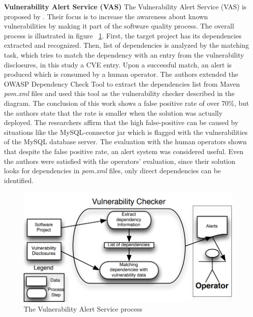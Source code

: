 \documentclass[pdf,bookmarks,colorlinks=true]{IEEEtran}
\begin{document}

\textbf{Vulnerability Alert Service (VAS)}
The Vulnerability Alert Service (VAS) is proposed by \cite{Cadariu2015}. Their focus is to increase the awareness about known vulnerabilities by making it part of the software quality process. The overall process is illustrated in figure ~\ref{VASProcess}. First, the target project has its dependencies extracted and recognized. Then, list of dependencies is analyzed by the matching task, which tries to match the dependency with an entry from the vulnerability disclosures, in this study a CVE entry. Upon a successful match, an alert is produced which is consumed by a human operator. The authors extended the OWASP Dependency Check Tool to extract the dependencies list from Maven {\em pom.xml} files and used this tool as the vulnerability checker described in the diagram.
The conclusion of this work shows a false positive rate of over 70\%, but the authors state that the rate is smaller when the solution was actually deployed. 
The researchers affirm that the high false-positive can be caused by situations like the MySQL-connector jar which is flagged with the vulnerabilities of the MySQL database server. The evaluation with the human operators shown that despite the false positive rate, an alert system was considered useful. Even the authors were satisfied with the operators' evaluation, since their solution looks for dependencies in {\em pom.xml} files, only direct dependencies can be identified.

\begin{figure}[h]
	\centering
	\includegraphics[scale=0.28]{VASProcess.png}
	\caption{The Vulnerability Alert Service process}
	\label{VASProcess}
\end{figure}
\end{document}
